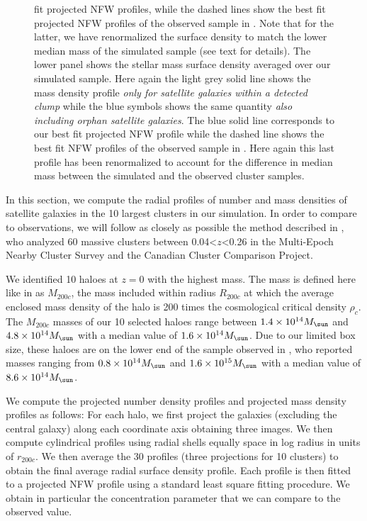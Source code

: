 \begin{figure}
{    fit projected NFW  profiles, while the  dashed lines  show the best  
    fit projected NFW profiles of the observed sample in
    \citet{vanderburgEvidenceInsideoutGrowth2015}.  Note  that for the
    latter,  we have  renormalized the  surface density  to match  the
    lower median mass of the  simulated sample (see text for details).
    The lower  panel shows the  stellar mass surface  density averaged
    over our  simulated sample. Here  again the light grey  solid line
    shows the  mass density profile  {\it only for  satellite galaxies
      within a detected  clump} while the blue symbols  shows the same
    quantity {\it also including  orphan satellite galaxies}. The blue
    solid  line corresponds  to our  best  fit projected NFW  profile while  the
    dashed line shows the best fit NFW profiles of the observed sample
    in \citet{vanderburgEvidenceInsideoutGrowth2015}.  Here again this
    last profile has  been renormalized to account  for the difference
    in  median mass  between the  simulated and  the observed  cluster
    samples.}
%
  \label{fig:radial-profiles}
\end{figure}

In this  section, we compute  the radial  profiles of number  and mass
densities  of satellite  galaxies in  the 10  largest clusters  in our
simulation. In  order to  compare to observations,  we will  follow as
closely      as     possible      the     method      described     in
\citet{vanderburgEvidenceInsideoutGrowth2015}, who analyzed 60 massive
clusters between 0.04<$z$<0.26 in  the Multi-Epoch Nearby Cluster Survey
and the Canadian Cluster Comparison Project.

We identified 10  haloes at $z=0$ with the highest  mass.  The mass is
defined here like  in \citet{vanderburgEvidenceInsideoutGrowth2015} as
$M_{200c}$, the  mass included within  radius $R_{200c}$ at  which the
average  enclosed  mass   density  of  the  halo  is   200  times  the
cosmological critical density $\rho_c$.   The $M_{200c}$ masses of our
10 selected  haloes range between  $1.4 \times 10^{14}\msol$  and $4.8
\times 10^{14}\msol$ with a median value of $1.6 \times 10^{14}\msol$.
Due to our limited box size, these  haloes are on the lower end of the
sample observed  in \citet{vanderburgEvidenceInsideoutGrowth2015}, who
reported masses ranging from $0.8 \times 10^{14}\msol$ and $1.6 \times
10^{15}\msol$ with a median value of $8.6 \times 10^{14}\msol$.

We compute  the projected number  density profiles and  projected mass
density  profiles as  follows: For  each  halo, we  first project  the
galaxies  (excluding the  central galaxy)  along each  coordinate axis
obtaining three  images.  We  then compute cylindrical  profiles using
radial shells equally space in log  radius in units of $r_{200c}$.  We
then average  the 30 profiles  (three projections for 10 clusters) to
obtain the final average radial surface density profile.  Each profile
is then fitted to a projected NFW profile \citep{navarroStructureColdDark1996b} using a
standard least square fitting procedure.   We obtain in particular the
concentration parameter that we can compare to the observed value.

